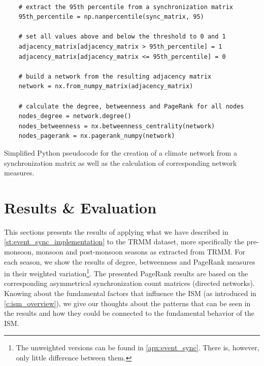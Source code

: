 \begin{listing}[h]
  \begin{verbatim}

    # extract the 95th percentile from a synchronization matrix
    95th_percentile = np.nanpercentile(sync_matrix, 95)

    # set all values above and below the threshold to 0 and 1
    adjacency_matrix[adjacency_matrix > 95th_percentile] = 1
    adjacency_matrix[adjacency_matrix <= 95th_percentile] = 0

    # build a network from the resulting adjacency matrix
    network = nx.from_numpy_matrix(adjacency_matrix)

    # calculate the degree, betweenness and PageRank for all nodes
    nodes_degree = network.degree()
    nodes_betweenness = nx.betweenness_centrality(network)
    nodes_pagerank = nx.pagerank_numpy(network)

  \end{verbatim}
  \caption{Simplified Python pseudocode for the creation of a climate network from a synchronization matrix as well as the calculation of corresponding network measures.}
  \label{lst:climate_networks}
\end{listing}

\section{Results \& Evaluation}
\label{st:event_sync_results}
This sections presents the results of applying what we have described in \cref{st:event_sync_implementation} to the TRMM dataset, more specifically the pre-monsoon, monsoon and post-monsoon seasons as extracted from TRMM. For each season, we show the results of degree, betweenness and PageRank measures in their weighted variation\footnote{The unweighted versions can be found in \cref{apx:event_sync}. There is, however, only little difference between them.}. The presented PageRank results are based on the corresponding asymmetrical synchronization count matrices (directed networks). Knowing about the fundamental factors that influence the ISM (as introduced in \cref{c:ism_overview}), we give our thoughts about the patterns that can be seen in the results and how they could be connected to the fundamental behavior of the ISM.

